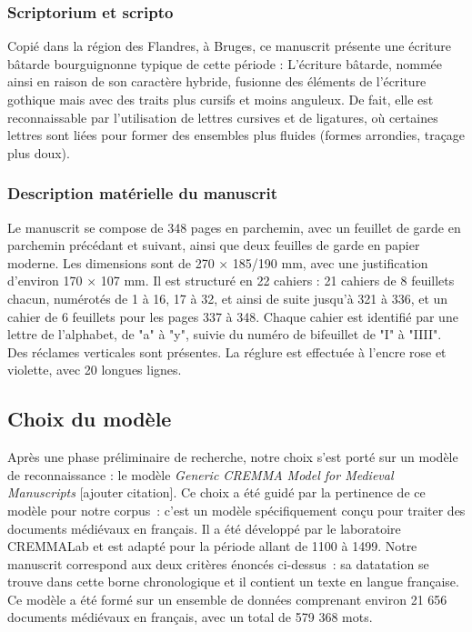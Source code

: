 \documentclass[12pt,a4paper,oneside,titlepage]{article} %
\begin{document}
\subsubsection{ Scriptorium et scripto}
Copié dans la région des Flandres, à Bruges, ce manuscrit présente une écriture bâtarde bourguignonne typique de cette période : L'écriture bâtarde, nommée ainsi en raison de son caractère hybride, fusionne des éléments de l'écriture gothique mais avec des traits plus cursifs et moins anguleux. De fait, elle est reconnaissable par l'utilisation de lettres cursives et de ligatures, où certaines lettres sont liées pour former des ensembles plus fluides (formes arrondies, traçage plus doux). 

\subsubsection{Description matérielle du manuscrit}

Le manuscrit se compose de 348 pages en parchemin, avec un feuillet de garde en parchemin précédant et suivant, ainsi que deux feuilles de garde en papier moderne. Les dimensions sont de 270 × 185/190 mm, avec une justification d'environ 170 × 107 mm. Il est structuré en 22 cahiers : 21 cahiers de 8 feuillets chacun, numérotés de 1 à 16, 17 à 32, et ainsi de suite jusqu'à 321 à 336, et un cahier de 6 feuillets pour les pages 337 à 348. Chaque cahier est identifié par une lettre de l'alphabet, de "a" à "y", suivie du numéro de bifeuillet de "I" à "IIII". Des réclames verticales sont présentes. La réglure est effectuée à l'encre rose et violette, avec 20 longues lignes.

\subsection{Choix du modèle}

Après une phase préliminaire de recherche, notre choix s'est porté sur un modèle de reconnaissance : le modèle \emph{Generic CREMMA Model for Medieval Manuscripts} [ajouter citation]. Ce choix a été guidé par la pertinence de ce modèle pour notre corpus : c’est un modèle spécifiquement conçu pour traiter des documents médiévaux en français. Il a été développé par le laboratoire CREMMALab et est adapté pour la période allant de 1100 à 1499. Notre manuscrit correspond aux deux critères énoncés ci-dessus : sa datatation se trouve dans cette borne chronologique et il contient un texte en langue française. Ce modèle a été formé sur un ensemble de données comprenant environ 21 656 documents médiévaux en français, avec un total de 579 368 mots.
\end{document}
